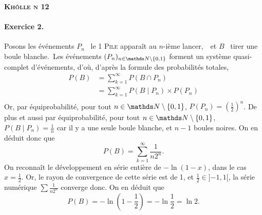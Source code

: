 \documentclass[a4paper]{article}
\def\khollenum{12}
\begin{document}
	\begin{center}
		\bfseries\scshape\Huge Khôlle n \khollenum
	\end{center}

	\paragraph{Exercice 2.}
	Posons les événements $P_n$\/ \guillemotleft~le 1 \textsc{Pile} apparaît au $n$-ième lancer,~\guillemotright\ et $B$\/ \guillemotleft~tirer une boule blanche.~\guillemotright\@ Les événements $(P_n)_{n \in \N}$\/ forment un système quasi-complet d'événements, d'où, d'après la formule des probabilités totales,
	\begin{align*}
		P(B) &= \sum_{k=1}^\infty P(B \cap P_n) \\
		&= \sum_{k=1}^\infty P(B  \mid P_n) \times P(P_n)\\
	\end{align*}
	Or, par équiprobabilité, pour tout $n \in \N$, $P(P_n) = \left(\frac{1}{2}\right)^n$.
	De plus et aussi par équiprobabilité, pour tout $n \in \N$, $P(B  \mid P_n) = \frac{1}{n}$ car il y a une seule boule blanche, et $n - 1$\/ boules noires.
	On en déduit donc que \[
		P(B) = \sum_{k=1}^\infty \frac{1}{n 2^n}
	.\] On reconnaît le développement en série entière de $-\ln(1 - x)$, dans le cas $x = \frac{1}{2}$. Or, le rayon de convergence de cette série est de 1, et $\frac{1}{2} \in {]{-1},1[}$, la série numérique $\sum \frac{1}{n 2^n}$\/ converge donc. On en déduit que \[
		\boxed{P(B) = -\ln\left(1 - \frac{1}{2}\right) = -\ln \frac{1}{2} = \ln 2.}
	\]
\end{document}
